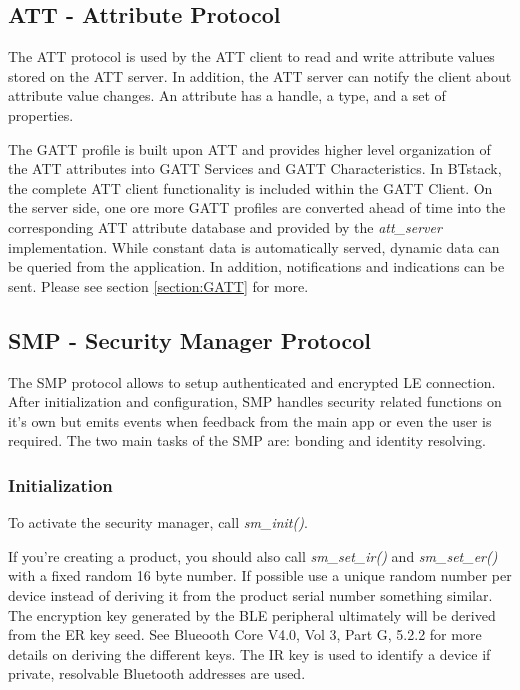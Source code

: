 \subsection{ATT - Attribute Protocol}

The ATT protocol is used by the ATT client to read and write attribute values stored on the ATT server. In addition, the ATT server can notify the client about attribute value changes. An attribute has a handle, a type, and a set of properties.

The GATT profile is built upon ATT and provides higher level organization of the ATT attributes into GATT Services and GATT Characteristics. In BTstack, the complete ATT client functionality is included within the GATT Client. On the server side, one ore more GATT profiles are converted ahead of time into the corresponding ATT attribute database and provided by the \emph{att\_server} implementation. While constant data is automatically served, dynamic data can be queried from the application. In addition, notifications and indications can be sent. Please see section \ref{section:GATT} for more.

\subsection{SMP - Security Manager Protocol }

The SMP protocol allows to setup authenticated and encrypted LE connection. After initialization and configuration, SMP handles security related functions on it's own but emits events when feedback from the main app or even the user is required. The two main tasks of the SMP are: bonding and identity resolving.

\subsubsection{Initialization}

To activate the security manager, call \emph{sm\_init()}. 

If you're creating a product, you should also call \emph{sm\_set\_ir()} and \emph{sm\_set\_er()} with a fixed random 16 byte number. If possible use a unique random number per device instead of deriving it from the product serial number something similar. The encryption key generated by the BLE peripheral ultimately will be derived from the ER key seed. See Blueooth Core V4.0, Vol 3, Part G, 5.2.2 for more details on deriving the different keys. The IR key is used to identify a device if private, resolvable Bluetooth addresses are used.

